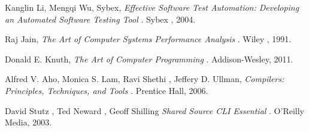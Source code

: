 \begin{thebibliography}{9}

   Kanglin Li, Mengqi Wu, Sybex,
   \emph{ Effective Software Test Automation: Developing an Automated Software Testing Tool  }.
   Sybex ,
   2004.

   Raj Jain,
   \emph{ The Art of Computer Systems Performance Analysis }.
   Wiley ,
   1991.

   Donald E. Knuth,
   \emph{ The Art of Computer Programming  }.
   Addison-Wesley,
   2011.

   Alfred V. Aho, Monica S. Lam, Ravi Shethi , Jeffery D. Ullman,
   \emph{ Compilers: Principles, Techniques, and Tools  }.
   Prentice Hall,
   2006.

    David Stutz , Ted Neward , Geoff Shilling
   \emph{ Shared Source CLI Essential  }.
   O'Reilly Media,
   2003.

\end{thebibliography}
